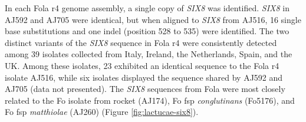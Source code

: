 In each \ac{Fola} \ac{r4} genome assembly, a single copy of \textit{SIX8} was identified. \textit{SIX8} in AJ592 and AJ705 were identical, but when aligned to \textit{SIX8} from AJ516, 16 single base substitutions and one indel (position 528 to 535) were identified. The two distinct variants of the \textit{SIX8} sequence in \ac{Fola} \ac{r4} were consistently detected among 39 isolates collected from Italy, Ireland, the Netherlands, Spain, and the UK. Among these isolates, 23 exhibited an identical sequence to the \ac{Fola} \ac{r4} isolate AJ516, while six isolates displayed the sequence shared by AJ592 and AJ705 (data not presented). The \textit{SIX8} sequences from \ac{Fola} were  most closely related to the \ac{Fo} isolate from rocket (AJ174), \ac{Fo} \ac{fsp} \textit{conglutinans} (Fo5176), and \ac{Fo} \ac{fsp} \textit{matthiolae} (AJ260) (Figure \ref{fig:lactucae-six8}).

